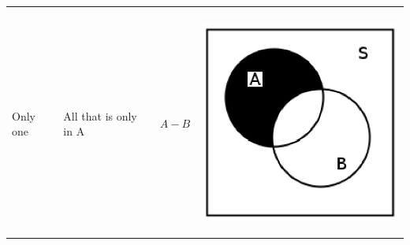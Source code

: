 \begin{center}
\begin{xtabular*}{\mytablewidth}[t]{|p{10\mystarwidth}|p{10\mystarwidth}|p{10\mystarwidth}|p{10\mystarwidth}|}
\begin{center}
      \vspace{2pt}
    \vspace{.1in}
    
    \end{center}



    \addtocounter{footnote}{-0}
     \tabularnewline{}
    
    
        Only one &
    
    
        All that is only in A &
    
    
        \begin{math}A-B\end{math} &
    
    
        
    \setcounter{subfigure}{0}

\label{m39373*uid14767}
    \begin{center}
    \label{m39373*uid14767!!!underscore!!!media}\label{m39373*uid14767!!!underscore!!!printimage}\includegraphics[width=300px]{col11306.imgs/m39373_a-b.png} %
        

\end{center}
\end{xtabular*}
\end{center}
